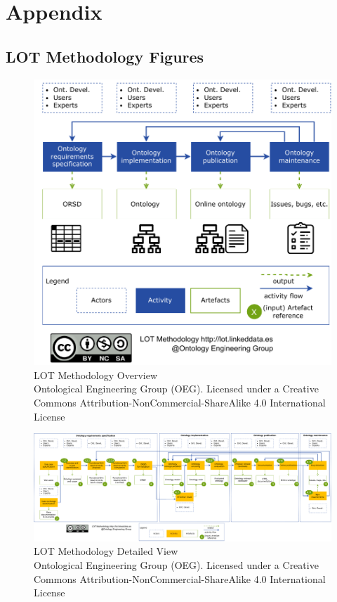 \documentclass{guideline/sty/rapport}
\begin{document}
  
\MyBibliography

\newpage
\appendix
\section{Appendix}

\subsection{LOT Methodology Figures} \label{sec:lotfigure}

    \begin{figure}[H]
        \centering
          \includegraphics[width=\textwidth]{images/LOTFigure1.pdf}
          \caption{LOT Methodology Overview \\ Ontological Engineering Group (OEG). Licensed under a Creative Commons Attribution-NonCommercial-ShareAlike 4.0 International License}
    \label{fig:lotfigure1}
    \end{figure}
    
     \begin{figure}[H]
        \centering
          \includegraphics[width=1.1\textwidth]{images/LOTFigure2.pdf}
          \caption{LOT Methodology Detailed View \\ Ontological Engineering Group (OEG). Licensed under a Creative Commons Attribution-NonCommercial-ShareAlike 4.0 International License}
    \label{fig:lotfigure2}
    \end{figure}
    
\end{document}
